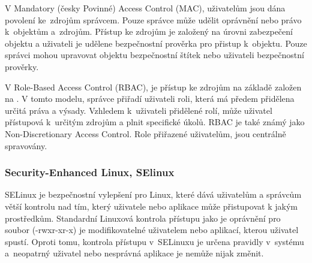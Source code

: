 \documentclass[a4paper,12pt]{article}
\begin{document}

V Mandatory (česky Povinné) Access Control (MAC), uživatelům jsou dána povolení ke~zdrojům správcem. Pouze správce může udělit oprávnění nebo právo k~objektům a~zdrojům. Přístup ke zdrojům je založený na úrovni zabezpečení objektu a uživateli je udělene bezpečnostní prověrka pro přistup k~objektu. Pouze správci mohou upravovat objektu bezpečnostní štítek nebo uživateli bezpečnostní prověrky.


V Role-Based Access Control (RBAC), je přístup ke zdrojům na základě založen na . V tomto modelu, správce přiřadí uživateli roli, která má předem přidělena určitá práva a výsady. Vzhledem k~uživateli přidělené rolí, může uživatel přístupová k~určitým zdrojům a plnit specifické úkolů. RBAC je také známý jako Non-Discretionary Access Control. Role přiřazené uživatelům, jsou centrálně spravovány.


\subsubsection{Security-Enhanced Linux, SElinux}

SELinux je bezpečnostní vylepšení pro Linux, které dává uživatelům a správcům větší kontrolu nad tím, který uživatele nebo aplikace může přistupovat k jakým prostředkům. Standardní Linuxová kontrola přístupu jako je oprávnění pro soubor (-rwxr-xr-x) je modifikovatelné uživatelem nebo aplikací, kterou uživatel spustí. Oproti tomu, kontrola přístupu v~SELinuxu je určena pravidly v~systému a~neopatrný uživatel nebo nesprávná aplikace je nemůže nijak změnit.
\end{document}

